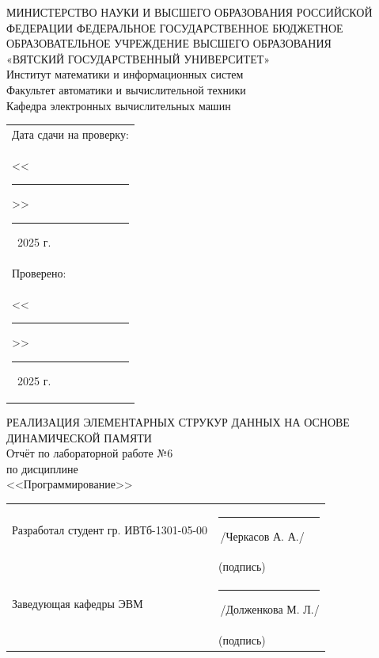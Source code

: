 \documentclass[oneside,a4paper,14pt]{extarticle}
\begin{document}
\newpage
\thispagestyle{empty}
\begin{center}
	МИНИСТЕРСТВО НАУКИ И ВЫСШЕГО ОБРАЗОВАНИЯ РОССИЙСКОЙ ФЕДЕРАЦИИ ФЕДЕРАЛЬНОЕ ГОСУДАРСТВЕННОЕ БЮДЖЕТНОЕ ОБРАЗОВАТЕЛЬНОЕ УЧРЕЖДЕНИЕ ВЫСШЕГО ОБРАЗОВАНИЯ\\
	«ВЯТСКИЙ ГОСУДАРСТВЕННЫЙ УНИВЕРСИТЕТ»\\
	Институт математики и информационных систем\\
	Факультет автоматики и вычислительной техники\\
	Кафедра электронных вычислительных машин
\end{center}
\vspace{10mm}

\hfill
\begin{tabular}{l}
	\footnotesize Дата сдачи на проверку:                                          \\
	\footnotesize <<\rule[-1mm]{5mm}{0.10mm}\/>>\rule[-1mm]{20mm}{0.10mm}\ 2025 г. \\
	\footnotesize Проверено:                                                       \\
	\footnotesize <<\rule[-1mm]{5mm}{0.10mm}\/>>\rule[-1mm]{20mm}{0.10mm}\ 2025 г. \\
\end{tabular}
\vfill

\begin{center}
	РЕАЛИЗАЦИЯ ЭЛЕМЕНТАРНЫХ СТРУКУР ДАННЫХ НА ОСНОВЕ ДИНАМИЧЕСКОЙ ПАМЯТИ\\
	Отчёт по лабораторной работе №6\\
	по дисциплине\\
	<<Программирование>>\\
\end{center}
\vspace{25mm}
\noindent
\begin{tabular}{ll}
	Разработал студент гр. ИВТб-1301-05-00 & \rule[-1mm]{30mm}{0.10mm}\,/Черкасов А. А./   \\
	                                       & \hspace{8mm}\footnotesize(подпись)            \\
	Заведующая кафедры ЭВМ                 & \rule[-1mm]{30mm}{0.10mm}\,/Долженкова М. Л./ \\
	                                       & \hspace{8mm}\footnotesize(подпись)            \\
\end{tabular}
\end{document}
